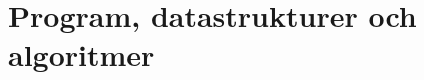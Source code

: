 \documentclass{lecturenotes}
\renewcommand{\vecka}{2}
\begin{document}
\frame{\titlepage}
\setnextsection{\vecka}
\section[Vecka \vecka: Program]{Program, datastrukturer och algoritmer}
\frame{\tableofcontents}



\end{document}
